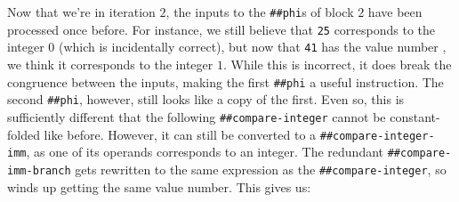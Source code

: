 Now that we're in iteration $2$, the inputs to the \Verb|##phi|s of block $2$
have been processed once before.  For instance, we still believe that
\Verb|25| corresponds to the integer $0$ (which is incidentally correct), but
now that \Verb|41| has the value number , we think it corresponds to
the integer $1$.  While this is incorrect, it does break the congruence between
the inputs, making the first \Verb|##phi| a useful instruction.  The second
\Verb|##phi|, however, still looks like a copy of the first.  Even so, this
is sufficiently different that the following \Verb|##compare-integer| cannot
be constant-folded like before.  However, it can still be converted to a
\Verb|##compare-integer-imm|, as one of its operands corresponds to an
integer.  The redundant \Verb|##compare-imm-branch| gets rewritten to the
same expression as the \Verb|##compare-integer|, so winds up getting the same
value number.  This gives us:
%
